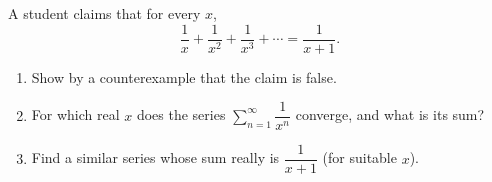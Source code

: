 A student claims that for every $x$,
\[
\dfrac{1}{x}+\dfrac{1}{x^2}+\dfrac{1}{x^3}+\cdots=\dfrac{1}{x+1}.
\]
\begin{enumerate}
\item[(a)] Show by a counterexample that the claim is false.
\item[(b)] For which real $x$ does the series $\displaystyle\sum_{n=1}^{\infty}\dfrac{1}{x^n}$ converge, and what is its sum?
\item[(c)] Find a similar series whose sum really is $\dfrac{1}{x+1}$ (for suitable $x$).
\end{enumerate}

